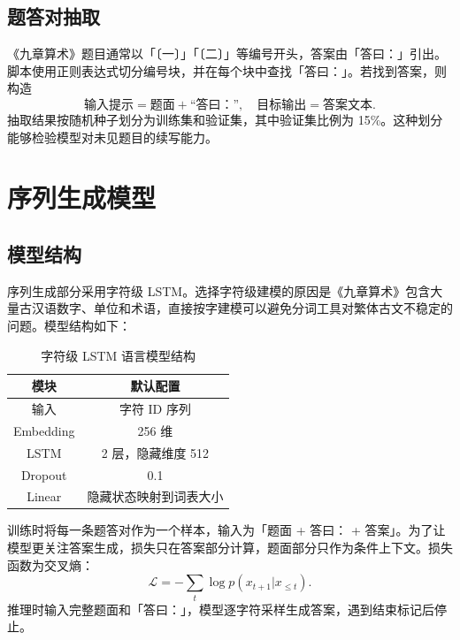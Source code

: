 \documentclass[a4paper,10pt,twocolumn]{article}
\begin{document}
\subsection{题答对抽取}
《九章算术》题目通常以「〔一〕」「〔二〕」等编号开头，答案由「答曰：」引出。脚本使用正则表达式切分编号块，并在每个块中查找「答曰：」。若找到答案，则构造
\[
\text{输入提示}=\text{题面}+\text{``答曰：''},\quad
\text{目标输出}=\text{答案文本}.
\]
抽取结果按随机种子划分为训练集和验证集，其中验证集比例为 15\%。这种划分能够检验模型对未见题目的续写能力。

\section{序列生成模型}
\subsection{模型结构}
序列生成部分采用字符级 LSTM。选择字符级建模的原因是《九章算术》包含大量古汉语数字、单位和术语，直接按字建模可以避免分词工具对繁体古文不稳定的问题。模型结构如下：

\begin{table}[H]
\centering
\small
\caption{字符级 LSTM 语言模型结构}
\begin{tabular}{c|c}
\toprule
模块 & 默认配置 \\
\midrule
输入 & 字符 ID 序列 \\
Embedding & 256 维 \\
LSTM & 2 层，隐藏维度 512 \\
Dropout & 0.1 \\
Linear & 隐藏状态映射到词表大小 \\
\bottomrule
\end{tabular}
\end{table}

训练时将每一条题答对作为一个样本，输入为「题面 + 答曰： + 答案」。为了让模型更关注答案生成，损失只在答案部分计算，题面部分只作为条件上下文。损失函数为交叉熵：
\[
\mathcal{L}=-\sum_t \log p(x_{t+1}|x_{\le t}).
\]
推理时输入完整题面和「答曰：」，模型逐字符采样生成答案，遇到结束标记后停止。
\end{document}
